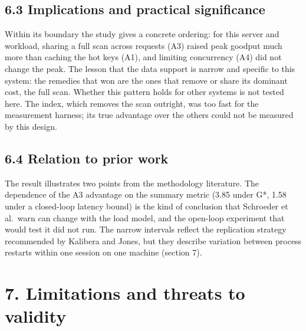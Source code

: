 \documentclass[
]{article}
\begin{document}
\subsection{6.3 Implications and practical
significance}\label{implications-and-practical-significance}

Within its boundary the study gives a concrete ordering: for this server
and workload, sharing a full scan across requests (A3) raised peak
goodput much more than caching the hot keys (A1), and limiting
concurrency (A4) did not change the peak. The lesson that the data
support is narrow and specific to this system: the remedies that won are
the ones that remove or share its dominant cost, the full scan. Whether
this pattern holds for other systems is not tested here. The index,
which removes the scan outright, was too fast for the measurement
harness; its true advantage over the others could not be measured by
this design.

\subsection{6.4 Relation to prior work}\label{relation-to-prior-work}

The result illustrates two points from the methodology literature. The
dependence of the A3 advantage on the summary metric (3.85 under G*,
1.58 under a closed-loop latency bound) is the kind of conclusion that
Schroeder et al.~warn can change with the load model, and the open-loop
experiment that would test it did not run. The narrow intervals reflect
the replication strategy recommended by Kalibera and Jones, but they
describe variation between process restarts within one session on one
machine (section 7).

\section{7. Limitations and threats to
validity}\label{limitations-and-threats-to-validity}
\end{document}
